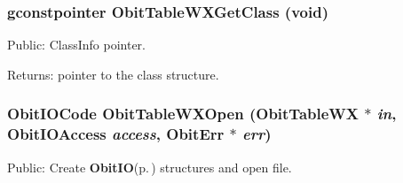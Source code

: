 \subsubsection{\setlength{\rightskip}{0pt plus 5cm}gconstpointer Obit\-Table\-WXGet\-Class (void)}\label{ObitTableWX_8h_a13}


Public: Class\-Info pointer. 

\begin{Desc}
\item[Returns:]pointer to the class structure. \end{Desc}
\subsubsection{\setlength{\rightskip}{0pt plus 5cm}Obit\-IOCode Obit\-Table\-WXOpen ({\bf Obit\-Table\-WX} $\ast$ {\em in}, Obit\-IOAccess {\em access}, {\bf Obit\-Err} $\ast$ {\em err})}\label{ObitTableWX_8h_a17}


Public: Create {\bf Obit\-IO}{\rm (p.\,\pageref{structObitIO})} structures and open file. 

